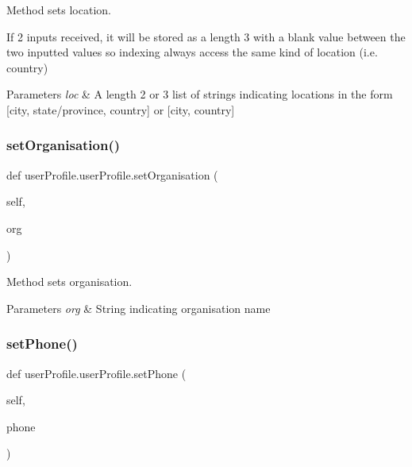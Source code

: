 Method sets location. 

If 2 inputs received, it will be stored as a length 3 with a blank value between the two inputted values so indexing always access the same kind of location (i.\+e. country) 
\begin{DoxyParams}{Parameters}
{\em loc} & A length 2 or 3 list of strings indicating locations in the form \mbox{[}city, state/province, country\mbox{]} or \mbox{[}city, country\mbox{]} \\
\hline
\end{DoxyParams}
\mbox{\label{classuserProfile_1_1userProfile_a240b062efefc77fb5137306709aef5ed}} 
\subsubsection{\texorpdfstring{set\+Organisation()}{setOrganisation()}}
{\footnotesize\ttfamily def user\+Profile.\+user\+Profile.\+set\+Organisation (\begin{DoxyParamCaption}\item[{}]{self,  }\item[{}]{org }\end{DoxyParamCaption})}



Method sets organisation. 


\begin{DoxyParams}{Parameters}
{\em org} & String indicating organisation name \\
\hline
\end{DoxyParams}
\mbox{\label{classuserProfile_1_1userProfile_af57b152c37a8ce53368166751893e0b3}} 
\subsubsection{\texorpdfstring{set\+Phone()}{setPhone()}}
{\footnotesize\ttfamily def user\+Profile.\+user\+Profile.\+set\+Phone (\begin{DoxyParamCaption}\item[{}]{self,  }\item[{}]{phone }\end{DoxyParamCaption})}



